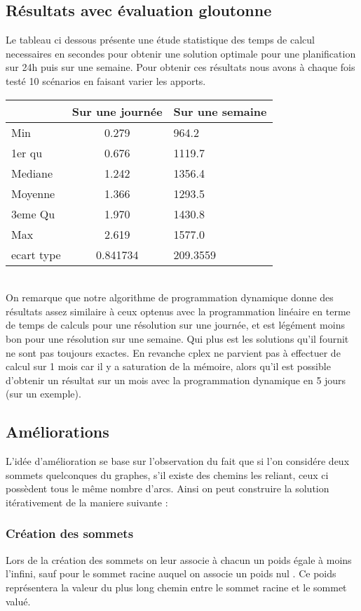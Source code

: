 \documentclass[a4paper]{report}
\begin{document}
\subsection{Résultats avec évaluation gloutonne}
Le tableau ci dessous présente une étude statistique des temps de calcul necessaires en secondes pour obtenir une solution optimale pour une planification sur 24h puis sur une semaine. Pour obtenir ces résultats nous avons à chaque fois testé 10 scénarios en faisant varier les apports.\\
\begin{tabular}{|l|c|l|}
  \hline
  &Sur une journée&Sur une semaine\\
  \hline
  Min &0.279 &964.2\\
  \hline
  1er qu & 0.676&1119.7 
\\
  \hline
  Mediane & 1.242&1356.4 
\\
  \hline
  Moyenne &1.366 & 1293.5
\\
  \hline
  3eme Qu &1.970&1430.8\\
  \hline
  Max & 2.619 &1577.0\\
\hline
 ecart type & 0.841734 & 209.3559\\
 
  \hline
\end{tabular}
\\
On remarque que notre algorithme de programmation dynamique donne des résultats assez similaire à ceux optenus avec la programmation linéaire en terme de temps de calculs pour une résolution sur une journée, et est légément moins bon pour une résolution sur une semaine. Qui plus est les solutions qu'il fournit ne sont pas toujours exactes. En revanche cplex ne parvient pas à effectuer de calcul sur 1 mois  car il y a saturation de la mémoire, alors qu'il est possible d'obtenir un résultat sur un mois avec la programmation dynamique en 5 jours (sur un exemple).

\subsection{Améliorations}
L'idée d'amélioration se base sur l'observation du fait que si l'on considére deux sommets quelconques du graphes, s'il existe des chemins les reliant, ceux ci possèdent tous le même nombre d'arcs. Ainsi on peut construire la solution itérativement de la maniere suivante :\\
\subsubsection*{Création des sommets}
Lors de la création des sommets on leur associe à chacun un poids égale à moins l'infini, sauf pour le sommet racine auquel on associe un poids nul . Ce poids représentera la valeur du plus long chemin entre le sommet racine et le sommet valué.\\
\end{document}
